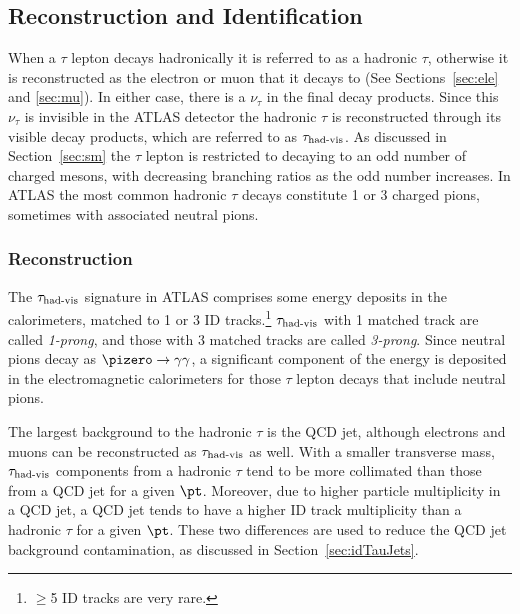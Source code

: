 \subsection{Reconstruction and Identification}
\par When a $\tau$ lepton decays hadronically it is referred to 
as a hadronic $\tau$, otherwise it is reconstructed as the electron or muon that 
it decays to (See Sections~\ref{sec:ele} and \ref{sec:mu}). In either case, there is a $\nu_\tau$
in the final decay products. Since this $\nu_\tau$ is invisible in the ATLAS detector the hadronic $\tau$ 
is reconstructed through its visible decay products, which are referred to as $\tau_{\text{had-vis}}$.
As discussed in Section~\ref{sec:sm} the $\tau$ lepton is restricted to decaying to an 
odd number of charged mesons, with decreasing branching ratios as the odd number increases. 
In ATLAS the most common hadronic $\tau$ decays constitute 1 or 3 charged pions, sometimes with associated 
neutral pions. 

\subsubsection{Reconstruction}
\par The $\tau_{\text{had-vis}}$ signature in ATLAS comprises some energy deposits in the 
calorimeters, matched to 1 or 3 ID tracks.\footnote{$\geq$5 ID tracks are very rare.} 
$\tau_{\text{had-vis}}$ with 1 matched track are 
called {\it 1-prong}, and those with 3 matched tracks are called {\it 3-prong}. 
Since neutral pions decay as $\pizero\to\gamma\gamma$, a significant component of the energy is deposited in 
the electromagnetic calorimeters for those $\tau$ lepton decays that include neutral pions. 

\par The largest background to the hadronic $\tau$ 
is the QCD jet, although electrons and muons can be reconstructed as $\tau_{\text{had-vis}}$ as well. 
With a smaller transverse mass, $\tau_{\text{had-vis}}$ components from a hadronic $\tau$ tend to be more 
collimated than those from a QCD jet for a given $\pt$. Moreover, due to higher particle 
multiplicity in a QCD jet, a QCD jet tends to have a higher ID track multiplicity  
than a hadronic $\tau$ for a given $\pt$. These two differences are used to reduce the QCD jet 
background contamination, as discussed in Section~\ref{sec:idTauJets}.
     
